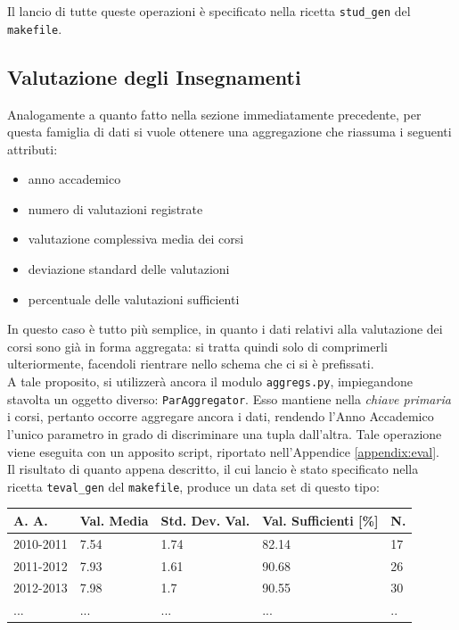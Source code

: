 		\vspace{0.4cm}

		Il lancio di tutte queste operazioni è specificato nella ricetta \texttt{stud\_gen} del \texttt{makefile}.

	\subsection{Valutazione degli Insegnamenti}

		Analogamente a quanto fatto nella sezione immediatamente precedente, per questa famiglia di dati si vuole ottenere una aggregazione che riassuma i seguenti attributi:

		\begin{itemize}
			\item anno accademico
			\item numero di valutazioni registrate
			\item valutazione complessiva media dei corsi
			\item deviazione standard delle valutazioni
			\item percentuale delle valutazioni sufficienti
		\end{itemize}

		In questo caso è tutto più semplice, in quanto i dati relativi alla valutazione dei corsi sono già in forma aggregata: si tratta quindi solo di comprimerli ulteriormente, facendoli rientrare nello schema che ci si è prefissati. \\
		
		A tale proposito, si utilizzerà ancora il modulo \texttt{aggregs.py}, impiegandone stavolta un oggetto diverso: \texttt{ParAggregator}. Esso mantiene nella \textit{chiave primaria} i corsi, pertanto occorre aggregare ancora i dati, rendendo l'Anno Accademico l'unico parametro in grado di discriminare una tupla dall'altra. Tale operazione viene eseguita con un apposito script, riportato nell'Appendice \ref{appendix:eval}. \\

		Il risultato di quanto appena descritto, il cui lancio è stato specificato nella ricetta \texttt{teval\_gen} del \texttt{makefile}, produce un data set di questo tipo:\\

		\begin{tabular}{lllll}
		\hline
		A. A. & Val. Media & Std. Dev. Val. & Val. Sufficienti {[}\%{]} & N. \\ \hline
		2010-2011 & 7.54 & 1.74 & 82.14 & 17 \\
		2011-2012 & 7.93 & 1.61 & 90.68 & 26 \\
		2012-2013 & 7.98 & 1.7 & 90.55 & 30 \\
		... & ... & ... & ... & .. \\ \hline
		\end{tabular}

